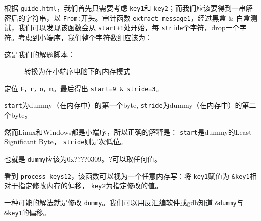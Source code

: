 \documentclass[a4pper,12pt,onecolumn]{article}
\begin{document}
根据 \texttt{guide.html}，我们首先只需要考虑 \texttt{key1}和 \texttt{key2}；而我们应该要得到一串解密后的字符串，以 \texttt{From:}开头。审计函数 \texttt{extract\_message1}，经过黑盒 \& 白盒测试，我们可以发现该函数会从 \texttt{start+1}处开始，每 \texttt{stride}个字符，drop一个字符。考虑到小端序，我们整个字符数组应该为：

这是我们的解题脚本：

\begin{figure}[htpb]
    
    \caption{转换为在小端序电脑下的内存模式}
    \label{fig:solve}
\end{figure}

定位 \texttt{F，r，o，m}。最后得出 \texttt{start=9 \& stride=3}。

 \texttt{start}为dummy（在内存中）的第一个byte,  \texttt{stride}为dummy（在内存中）的第二个byte。

然而Linux和Windows都是小端序，所以正确的解释是： \texttt{start}是dummy的Least Significant Byte， \texttt{stride}则是次低位。

也就是 \texttt{dummy}应该为0x????0309。?可以取任何值。

看到 \texttt{process\_keys12}，该函数可以视为一个任意内存写：将 \texttt{key1}赋值为 \texttt{\&key1}相对于指定修改内存的偏移， \texttt{key2}为指定修改的值。

一种可能的解法就是修改 \texttt{dummy}。我们可以用反汇编软件或gdb知道 \texttt{\&dummy}与 \texttt{\&key1}的偏移。
\end{document}
